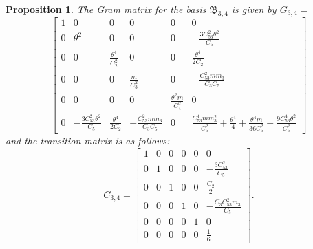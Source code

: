 \documentclass[table]{amsart}
\newtheorem{proposition}[theorem]{Proposition}
\numberwithin{equation}{section}
\begin{document}
\begin{proposition}
    The Gram matrix for the basis $\mathfrak{B}_{3,4}$ is given by $G_{3, 4}=$
   \[
\begin{bmatrix}
1 
& 0 
& 0 
& 0 
& 0 
& 0 \\[8pt]

0 
& \theta^2 
& 0 
& 0 
& 0 
& -\tfrac{3 C_{53}^2 \theta^2}{ C_5} \\[8pt]

0 
& 0 
& \tfrac{\theta^4}{C_2^2} 
& 0 
& 0 
& \tfrac{ \theta^4}{2 C_2} \\[8pt]

0 
& 0 
& 0 
& \tfrac{m}{C_3^2} 
& 0 
& -\tfrac{ C_{53}^2 m m_3}{C_3 C_5} \\[8pt]

0 
& 0 
& 0 
& 0 
& \tfrac{\theta^2 m}{C_4^2} 
& 0 \\[8pt]

0 
& -\tfrac{3 C_{53}^2 \theta^2}{ C_5} 
& \tfrac{ \theta^4}{2 C_2} 
& -\tfrac{ C_{53}^2 m m_3}{C_3 C_5} 
& 0 
& \tfrac{ C_{53}^4 m m_3^2}{ C_5^2}
  + \tfrac{ \theta^4}{4 }
  + \tfrac{\theta^4 m}{36 C_5^2}
  + \tfrac{9 C_{53}^4 \theta^2}{ C_5^2}
\end{bmatrix}
\]
 and the transition matrix is as follows:
\[
C_{3,4}=\begin{bmatrix}
1 & 0 & 0 & 0 & 0 & 0 \\[8pt]
0 & 1 & 0 & 0 & 0 & -\tfrac{3C_{53}^2}{C_5} \\[8pt]
0 & 0 & 1 & 0 & 0 & \tfrac{C_2}{2} \\[8pt]
0 & 0 & 0 & 1 & 0 & -\tfrac{C_3 C_{53}^2 m_3}{C_5} \\[8pt]
0 & 0 & 0 & 0 & 1 & 0 \\
0 & 0 & 0 & 0 & 0 & \tfrac{1}{6}
\end{bmatrix}.
\]

\end{proposition}
\end{document}
